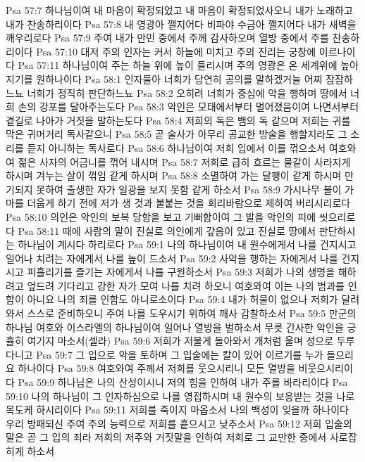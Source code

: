 Psa 57:7  하나님이여 내 마음이 확정되었고 내 마음이 확정되었사오니 내가 노래하고 내가 찬송하리이다
Psa 57:8  내 영광아 깰지어다 비파야 수금아 깰지어다 내가 새벽을 깨우리로다
Psa 57:9  주여 내가 만민 중에서 주께 감사하오며 열방 중에서 주를 찬송하리이다
Psa 57:10  대저 주의 인자는 커서 하늘에 미치고 주의 진리는 궁창에 이르나이다
Psa 57:11  하나님이여 주는 하늘 위에 높이 들리시며 주의 영광은 온 세계위에 높아지기를 원하나이다
Psa 58:1  인자들아 너희가 당연히 공의를 말하겠거늘 어찌 잠잠하느뇨 너희가 정직히 판단하느뇨
Psa 58:2  오히려 너희가 중심에 악을 행하며 땅에서 너희 손의 강포를 달아주는도다
Psa 58:3  악인은 모태에서부터 멀어졌음이여 나면서부터 곁길로 나아가 거짓을 말하는도다
Psa 58:4  저희의 독은 뱀의 독 같으며 저희는 귀를 막은 귀머거리 독사같으니
Psa 58:5  곧 술사가 아무리 공교한 방술을 행할지라도 그 소리를 듣지 아니하는 독사로다
Psa 58:6  하나님이여 저희 입에서 이를 꺾으소서 여호와여 젊은 사자의 어금니를 꺾어 내시며
Psa 58:7  저희로 급히 흐르는 물같이 사라지게 하시며 겨누는 살이 꺾임 같게 하시며
Psa 58:8  소멸하여 가는 달팽이 같게 하시며 만기되지 못하여 출생한 자가 일광을 보지 못함 같게 하소서
Psa 58:9  가시나무 불이 가마를 더웁게 하기 전에 저가 생 것과 불붙는 것을 회리바람으로 제하여 버리시리로다
Psa 58:10  의인은 악인의 보복 당함을 보고 기뻐함이여 그 발을 악인의 피에 씻으리로다
Psa 58:11  때에 사람의 말이 진실로 의인에게 갚음이 있고 진실로 땅에서 판단하시는 하나님이 계시다 하리로다
Psa 59:1  나의 하나님이여 내 원수에게서 나를 건지시고 일어나 치려는 자에게서 나를 높이 드소서
Psa 59:2  사악을 행하는 자에게서 나를 건지시고 피흘리기를 즐기는 자에게서 나를 구원하소서
Psa 59:3  저희가 나의 생명을 해하려고 엎드려 기다리고 강한 자가 모여 나를 치려 하오니 여호와여 이는 나의 범과를 인함이 아니요 나의 죄를 인함도 아니로소이다
Psa 59:4  내가 허물이 없으나 저희가 달려와서 스스로 준비하오니 주여 나를 도우시기 위하여 깨사 감찰하소서
Psa 59:5  만군의 하나님 여호와 이스라엘의 하나님이여 일어나 열방을 벌하소서 무릇 간사한 악인을 긍휼히 여기지 마소서(셀라)
Psa 59:6  저희가 저물게 돌아와서 개처럼 울며 성으로 두루 다니고
Psa 59:7  그 입으로 악을 토하며 그 입술에는 칼이 있어 이르기를 누가 들으리요 하나이다
Psa 59:8  여호와여 주께서 저희를 웃으시리니 모든 열방을 비웃으시리이다
Psa 59:9  하나님은 나의 산성이시니 저의 힘을 인하여 내가 주를 바라리이다
Psa 59:10  나의 하나님이 그 인자하심으로 나를 영접하시며 내 원수의 보응받는 것을 나로 목도케 하시리이다
Psa 59:11  저희를 죽이지 마옵소서 나의 백성이 잊을까 하나이다 우리 방패되신 주여 주의 능력으로 저희를 흩으시고 낮추소서
Psa 59:12  저희 입술의 말은 곧 그 입의 죄라 저희의 저주와 거짓말을 인하여 저희로 그 교만한 중에서 사로잡히게 하소서
